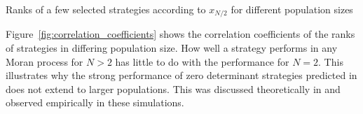 \documentclass[10pt,journal]{IEEEtran}
\begin{document}
\begin{table}[!hbtp]
    \centering
    \scriptsize
    
    \caption{Ranks of a few selected strategies according to \(x_{N/2}\) for different
    population sizes}
    \label{tbl:ranks_v_size_coexist}
\end{table}


Figure~\ref{fig:correlation_coefficients} shows the correlation coefficients
of the ranks of strategies in differing population size. How well a strategy
performs in any Moran process for \(N>2\) has
little to do with the performance for \(N=2\). This illustrates why the strong
performance of zero determinant strategies predicted in \cite{Press2012} does
not extend to larger populations. This was discussed theoretically in
\cite{Adami2013} and observed empirically in these simulations.
\end{document}
